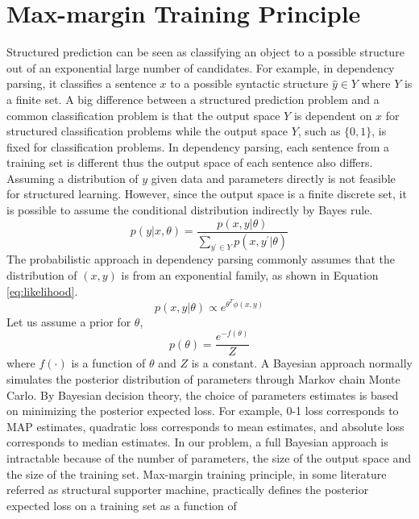 \section{Max-margin Training Principle}
\label{sec: Structural Support Vector Machine}
Structured prediction can be seen as classifying an object to a possible structure out of an exponential large number of candidates. For example, in dependency parsing, it classifies a sentence $x$ to a possible syntactic structure $\hat{y}\in Y$ where $Y$ is a finite set. A big difference between a structured prediction problem and a common classification problem is that the output space $Y$ is dependent on $x$ for structured classification problems while the output space $Y$, such as $\{0,1\}$, is fixed for classification problems. In dependency parsing, each sentence from a training set is different thus the output space of each sentence also differs. Assuming a distribution of $y$ given data and parameters directly is not feasible for structured learning. However, since the output space is a finite discrete set, it is possible to assume the conditional distribution indirectly by Bayes rule.
\begin{equation}
\label{eq:bayesrule}
p(y|x,\theta)=\frac{p(x,y|\theta)}{\sum_{y^{'}\in Y}p(x,y^{'}|\theta)}
\end{equation} 
The probabilistic approach in dependency parsing commonly assumes that the distribution of $(x,y)$ is from an exponential family, as shown in Equation \ref{eq:likelihood}. 
\begin{equation}
\label{eq:likelihood}
p(x,y|\theta)\propto e^{\theta^T\phi(x,y)}
\end{equation} 
Let us assume a prior for $\theta$,
\begin{equation}
\label{eq:prior}
p(\theta)=\frac{e^{-f(\theta)}}{Z}
\end{equation} 
where $f(\cdot)$ is a function of $\theta$ and $Z$ is a constant.
A Bayesian approach normally simulates the posterior distribution of parameters through Markov chain Monte Carlo. By Bayesian decision theory, the choice of parameters estimates is based on minimizing the posterior expected loss. For example, 0-1 loss corresponds to MAP estimates, quadratic loss corresponds to mean estimates, and absolute loss corresponds to median estimates. In our problem, a full Bayesian approach is intractable because of the number of parameters, the size of the output space and the size of the training set. Max-margin training principle, in some literature referred as structural supporter machine, practically defines the posterior expected loss on a training set as a function of 
